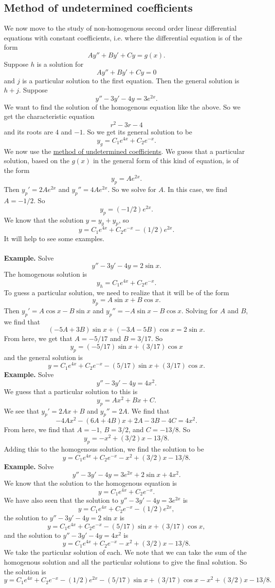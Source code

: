 \documentclass[11pt, oneside]{article}   	%
\begin{document}
\subsection{Method of undetermined coefficients}
We now move to the study of non-homogenous second order linear differential equations with constant coefficients, i.e. where the differential equation is of the form 
$$
Ay'' + By'+Cy = g(x).
$$
Suppose $h$ is a solution for 
$$
A y'' + By' + Cy = 0
$$
and $j$ is a particular solution to the first equation. Then the general solution is $h+j$. Suppose
$$
y'' - 3y' - 4y = 3e^{2x}.
$$
We want to find the solution of the homogenous equation like the above. So we get the characteristic equation 
$$
r^2 - 3r - 4
$$
and its roots are $4$ and $-1$.  So we get its general solution to be 
$$
y_g = C_1e^{4x} + C_2e^{-x}.
$$
We now use the \underline{method of undetermined coefficients}. We guess that a particular solution, based on the $g(x)$ in the general form of this kind of equation, is of the form
$$
y_p = Ae^{2x}.
$$
Then $y_p' = 2Ae^{2x}$ and $y_p'' = 4Ae^{2x}$. So we solve for $A$. In this case, we find $A = -1/2$. So
$$
y_p = (-1/2) e^{2x}.
$$
We know that the solution $y = y_g + y_p$, so 
$$
y =C_1e^{4x} + C_2e^{-x} - (1/2) e^{2x}.
$$
It will help to see some examples.\\\\
\textbf{Example.} Solve
$$
y'' - 3y' - 4y = 2\sin x.
$$
The homogenous solution is
$$
y_h = C_1e^{4x} + C_2e^{-x}.
$$
To guess a particular solution, we need to realize that it will be of the form
$$
y_p = A\sin x + B\cos x. 
$$
Then $y_p' = A\cos x - B\sin x$ and $y_p'' = -A\sin x - B\cos x$. Solving for $A$ and $B$, we find that
$$
(-5A + 3B)\sin x + (-3A-5B)\cos x = 2\sin x.
$$
From here, we get that $A = -5/17$ and $B = 3/17$. So
$$
y_p = (-5/17)\sin x + (3/17)\cos x
$$
and the general solution is 
$$
\boxed{y = C_1e^{4x} + C_2e^{-x}-(5/17)\sin x + (3/17)\cos x.}
$$
\textbf{Example.} Solve
$$
y'' - 3y' - 4y = 4x^2.
$$
We guess that a particular solution to this is 
$$
y_p =Ax^2 + Bx + C.
$$
We see that $y_p' = 2Ax + B$ and $y_p'' = 2A$. We find that 
$$
-4Ax^2 - (6A + 4B) x + 2A - 3B - 4C = 4x^2.
$$
From here, we find that $A=-1$, $B=3/2$, and $C = -13/8$. So 
$$
y_p = -x^2 +(3/2)x-13/8.
$$
Adding this to the homogenous solution, we find the solution to be
$$
\boxed{y=C_1e^{4x} + C_2e^{-x}-x^2 +(3/2)x-13/8.}
$$
\textbf{Example.} Solve
$$
y'' - 3y' - 4y = 3e^{2x} +2\sin x + 4x^2.
$$
We know that the solution to the homogenous equation is 
$$
y=C_1e^{4x} + C_2e^{-x}.
$$
We have also seen that the solution to $y'' - 3y' - 4y = 3e^{2x}$ is 
$$
y  =C_1e^{4x} + C_2e^{-x} - (1/2) e^{2x},
$$
the solution to $y'' - 3y' - 4y = 2\sin x$ is 
$$
y = C_1e^{4x} + C_2e^{-x}-(5/17)\sin x + (3/17)\cos x,
$$
and the solution to $y'' - 3y' - 4y = 4x^2$ is
$$
y=C_1e^{4x} + C_2e^{-x}-x^2 +(3/2)x-13/8.
$$
We take the particular solution of each. We note that we can take the sum of the homogenous solution and all the particular solutions to give the final solution. So the solution is
$$
\boxed{y = C_1e^{4x} + C_2e^{-x} - (1/2) e^{2x} -(5/17)\sin x + (3/17)\cos x -x^2 +(3/2)x-13/8. }
$$
\end{document}
